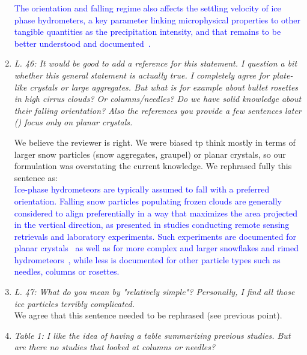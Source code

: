 \documentclass[12pt]{article}
\newcommand*{\blue}{\textcolor{blue}}
\begin{document}
\begin{enumerate}
    \blue{The orientation and falling regime also affects the settling velocity of ice phase hydrometers, a key parameter linking microphysical properties to other tangible quantities as the precipitation intensity, and that remains to be better understood and documented~\cite{Heymsfield_JAS_2004}.}\\

    \item \textit{L. 46: It would be good to add a reference for this statement. I question a bit whether this general statement is actually true. I completely agree for plate-like crystals or large aggregates. But what is for example about bullet rosettes in high cirrus clouds? Or columns/needles? Do we have solid knowledge about their falling orientation? Also the references you provide a few sentences later (\cite{Noel_JAMC_2005,Tinklenberg_JFM_2023}) focus only on planar crystals.}

    We believe the reviewer is right. We were biased tp think mostly in terms of larger snow particles (snow aggregates, graupel) or planar crystals, so our formulation was overstating the current knowledge. We rephrased fully this sentence as:\\
    
    \blue{Ice-phase hydrometeors are typically assumed to fall with a preferred orientation. Falling snow particles populating frozen clouds are generally considered to align preferentially in a way that maximizes the area projected in the vertical direction, as presented in studies conducting remote sensing retrievals and laboratory experiments.  Such experiments are documented for planar crystals~\cite{Noel_JAMC_2005,Matrosov_JAS_2005,Tinklenberg_JFM_2024} as well as for more complex and larger snowflakes and rimed hydrometeors~\cite{Kennedy_JAMC_2011, Ryzhkov_JAMC_2011, Koebschall_EF_2023}, while less is documented for other particle types such as needles, columns or rosettes. }\\


    \item \textit{L. 47: What do you mean by "relatively simple"? Personally, I find all those ice particles terribly complicated.}\\
    
    We agree that this sentence needed to be rephrased (see previous point).
    
    \item \textit{Table 1: I like the idea of having a table summarizing previous studies. But are there no studies that looked at columns or needles?}\\


\end{enumerate}
\end{document}
